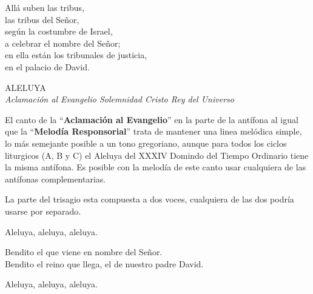 \documentclass[12pt, letterpaper]{report}
\begin{document}
    \noindent
    All\'a suben las tribus,\\
    las tribus del Se\~nor,\\
    seg\'un la costumbre de Israel,\\
    a celebrar el nombre del Se\~nor;\\
    en ella est\'an los tribunales de justicia,\\
    en el palacio de David.
    \clearpage



    \begin{center}
      {\large ALELUYA}\\
      \textit{Aclamaci\'on al Evangelio Solemnidad Cristo Rey del Universo}
    \end{center}

    El canto de la ``\textbf{Aclamaci\'on al Evangelio}'' en la parte de la ant\'ifona al igual que la ``\textbf{Melod\'ia Responsorial}'' trata de mantener una linea mel\'odica simple, lo m\'as semejante posible a un tono gregoriano, aunque para todos los ciclos liturgicos (A, B y C) el Aleluya del XXXIV Domindo del Tiempo Ordinario tiene la misma ant\'ifona. Es posible con la melod\'ia de este canto usar cualquiera de las ant\'ifonas complementarias.

    La parte del trisagio esta compuesta a dos voces, cualquiera de las dos podr\'ia usarse por separado.

    \noindent
    Aleluya, aleluya, aleluya.

    \noindent
    Bendito el que viene en nombre del Se\~nor.\\
    Bendito el reino que llega, el de nuestro padre David.

    \noindent
    Aleluya, aleluya, aleluya.
    \clearpage

\end{document}
